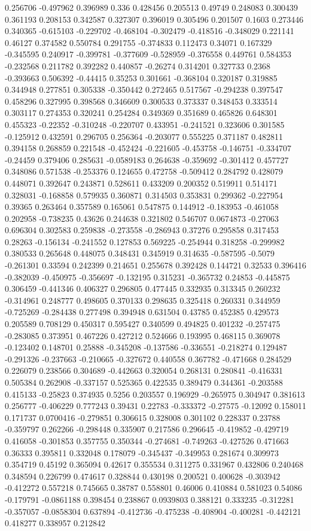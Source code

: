 0.256706 -0.497962 0.396989 0.336 0.428456 0.205513 0.49749 0.248083 0.300439 0.361193 0.208153 0.342587 0.327307 0.396019 0.305496 0.201507 0.1603 0.273446 0.340365 -0.615103 -0.229702 -0.468104 -0.302479 -0.418516 -0.348029 0.221141 0.46127 0.374582 0.550784 0.291755 -0.374833 0.112473 0.34071 0.167329 -0.345595 0.240917 -0.399781 -0.377609 -0.528959 -0.376558 0.449761 0.584353 -0.232568 0.211782 0.392282 0.440857 -0.26274 0.314201 0.327733 0.2368 -0.393663 0.506392 -0.44415 0.35253 0.301661 -0.368104 0.320187 0.319885 0.344948 0.277851 0.305338 -0.350442 0.272465 0.517567 -0.294238 0.397547 0.458296 0.327995 0.398568 0.346609 0.300533 0.373337 0.348453 0.333514 0.303117 0.274353 0.320241 0.254284 0.349369 0.351689 0.465826 0.648301 0.455323 -0.22352 -0.310248 -0.220707 0.433951 -0.241521 0.323606 0.301585 -0.125912 0.432591 0.296705 0.256364 -0.203077 0.555225 0.371187 0.482811 0.394158 0.268859 0.221548 -0.452424 -0.221605 -0.453758 -0.146751 -0.334707 -0.24459 0.379406 0.285631 -0.0589183 0.264638 -0.359692 -0.301412 0.457727 0.348086 0.571538 -0.253376 0.124655 0.472758 -0.509412 0.284792 0.428079 0.448071 0.392647 0.243871 0.528611 0.433209 0.200352 0.519911 0.514171 0.328031 -0.168858 0.579935 0.360871 0.314503 0.353831 0.299362 -0.227954 0.39365 0.263464 0.357589 0.165061 0.547875 0.144912 -0.183953 -0.461058 0.202958 -0.738235 0.43626 0.244638 0.321802 0.546707 0.0674873 -0.27063 0.696304 0.302583 0.259838 -0.273558 -0.286943 0.37276 0.295858 0.317453 0.28263 -0.156134 -0.241552 0.127853 0.569225 -0.254944 0.318258 -0.299982 0.380533 0.265648 0.448075 0.348431 0.345919 0.314635 -0.587595 -0.5079 -0.261301 0.33594 0.242399 0.214651 0.255678 0.392428 0.144721 0.32533 0.396416 -0.382039 -0.450975 -0.356697 -0.132195 0.315231 -0.365732 0.24853 -0.445875 0.306459 -0.441346 0.406327 0.296805 0.477445 0.332935 0.313345 0.260232 -0.314961 0.248777 0.498605 0.370133 0.298635 0.325418 0.260331 0.344959 -0.725269 -0.284438 0.277498 0.394948 0.631504 0.43785 0.452385 0.429573 0.205589 0.708129 0.450317 0.595427 0.340599 0.494825 0.401232 -0.257475 -0.283085 0.373951 0.467226 0.427212 0.524666 0.193995 0.468115 0.369078 -0.123402 0.148701 0.25888 -0.345208 -0.137586 -0.336551 -0.218274 0.129487 -0.291326 -0.237663 -0.210665 -0.327672 0.440558 0.367782 -0.471668 0.284529 0.226079 0.238566 0.304689 -0.442663 0.320054 0.268131 0.280841 -0.416331 0.505384 0.262908 -0.337157 0.525365 0.422535 0.389479 0.344361 -0.203588 0.415133 -0.25823 0.374935 0.5256 0.203557 0.196929 -0.265975 0.304947 0.381613 0.256777 -0.406229 0.777243 0.39431 0.22783 -0.333372 -0.27575 -0.12092 0.158011 0.171737 0.0700416 -0.279851 0.306615 0.328008 0.301102 0.228337 0.23788 -0.359797 0.262266 -0.298448 0.335907 0.217586 0.296645 -0.419852 -0.429719 0.416058 -0.301853 0.357755 0.350344 -0.274681 -0.749263 -0.427526 0.471663 0.36333 0.395811 0.332048 0.178079 -0.345437 -0.349953 0.281674 0.309973 0.354719 0.45192 0.365094 0.42617 0.355534 0.311275 0.331967 0.432806 0.240468 0.348594 0.226799 0.474617 0.328844 0.430198 0.200521 0.400628 -0.303942 -0.412272 0.557218 0.745665 0.38787 0.558801 0.46006 0.410884 0.581023 0.54086 -0.179791 -0.0861188 0.398454 0.238867 0.0939803 0.388121 0.333235 -0.312281 -0.357057 -0.0858304 0.637894 -0.412736 -0.475238 -0.408904 -0.400281 -0.442121 0.418277 0.338957 0.212842 